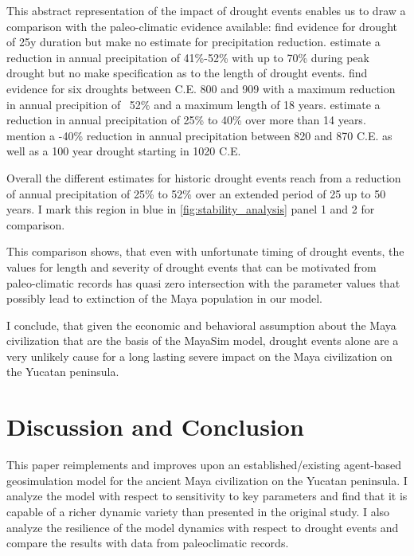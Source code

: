 This abstract representation of the impact of drought events enables us to draw a comparison with the paleo-climatic evidence available:
\cite{Stahle2011} find evidence for drought of 25y duration but make no estimate for precipitation reduction.
\cite{Evans2018} estimate a reduction in annual precipitation of 41\%-52\% with up to 70\% during peak drought but no make specification as to the length of drought events.
\cite{Medina-Elizalde2010} find evidence for six droughts between C.E. 800 and 909 with a maximum reduction in annual precipition of ~52\% and a maximum length of 18 years.
\cite{Medina-Elizalde2012} estimate a reduction in annual precipitation of 25\% to 40\% over more than 14 years.
\cite{Kennett2012} mention a -40\% reduction in annual precipitation between 820 and 870 C.E. as well as a 100 year drought starting in 1020 C.E.


Overall the different estimates for historic drought events reach from a reduction of annual precipitation of 25\% to 52\% over an extended period of 25 up to 50 years. I mark this region in blue in \cref{fig:stability_analysis} panel 1 and 2 for comparison.

This comparison shows, that even with unfortunate timing of drought events, the values for length and severity of drought events that can be motivated from paleo-climatic records has quasi zero intersection with the parameter values that possibly lead to extinction of the Maya population in our model.

I conclude, that given the economic and behavioral assumption about the Maya civilization that are the basis of the MayaSim model, drought events alone are a very unlikely cause for a long lasting severe impact on the Maya civilization on the Yucatan peninsula.

\section{Discussion and Conclusion}

This paper reimplements and improves upon an established/existing agent-based geosimulation model for the ancient Maya civilization on the Yucatan peninsula.
I analyze the model with respect to sensitivity to key parameters and find that it is capable of a richer dynamic variety than presented in the original study.
I also analyze the resilience of the model dynamics with respect to drought events and compare the results with data from paleoclimatic records.

